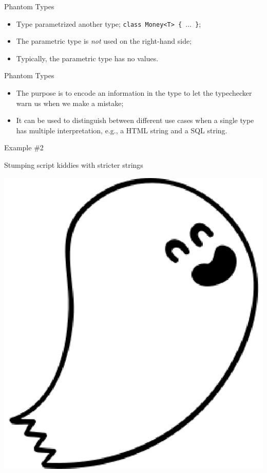 \documentclass[11pt]{beamer}
\renewcommand\big[1]{
  \begin{center}
    \Large{#1}
  \end{center}
}
\begin{document}
\begin{frame}
  \big{Phantom Types}

  \begin{itemize}
    \item Type parametrized another type; {\tt class Money<T> \{ $\ldots$ \}};
    \item The parametric type is \emph{not} used on the right-hand side;
    \item Typically, the parametric type has no values.
  \end{itemize}
\end{frame}

\begin{frame}
  \big{Phantom Types}

  \begin{itemize}
    \item The purpose is to encode an information in the type to let the typechecker warn us when we make a mistake;
    \item It can be used to distinguish between different use cases when a single type has multiple interpretation, e.g., a HTML string and a SQL string.
  \end{itemize}
\end{frame}

\begin{frame}
  \big{Example \#2}

  \centering Stumping script kiddies with stricter strings

  \vskip1cm

\end{frame}

\begin{frame}
  \centering \includegraphics[scale=0.8]{phantom.eps}
\end{frame}
\end{document}
